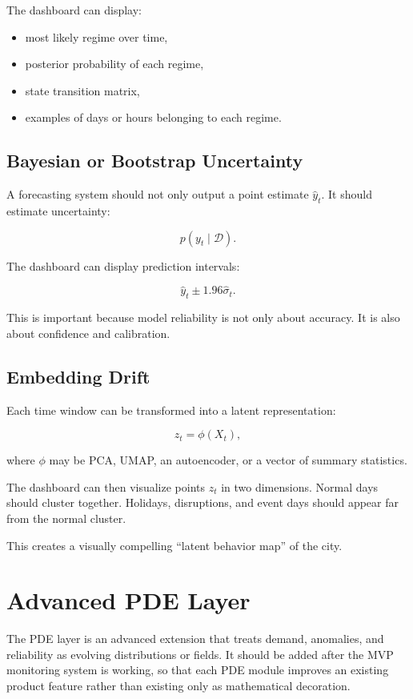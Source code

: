 \documentclass[11pt]{article}
\begin{document}
The dashboard can display:

\begin{itemize}
    \item most likely regime over time,
    \item posterior probability of each regime,
    \item state transition matrix,
    \item examples of days or hours belonging to each regime.
\end{itemize}

\subsection{Bayesian or Bootstrap Uncertainty}

A forecasting system should not only output a point estimate $\hat{y}_t$. It should estimate uncertainty:

\[
    p(y_t \mid \mathcal{D}).
\]

The dashboard can display prediction intervals:

\[
    \hat{y}_t \pm 1.96\hat{\sigma}_t.
\]

This is important because model reliability is not only about accuracy. It is also about confidence and calibration.

\subsection{Embedding Drift}

Each time window can be transformed into a latent representation:

\[
    z_t = \phi(X_t),
\]

where $\phi$ may be PCA, UMAP, an autoencoder, or a vector of summary statistics.

The dashboard can then visualize points $z_t$ in two dimensions. Normal days should cluster together. Holidays, disruptions, and event days should appear far from the normal cluster.

This creates a visually compelling ``latent behavior map'' of the city.

\section{Advanced PDE Layer}

The PDE layer is an advanced extension that treats demand, anomalies, and reliability as evolving distributions or fields. It should be added after the MVP monitoring system is working, so that each PDE module improves an existing product feature rather than existing only as mathematical decoration.
\end{document}
